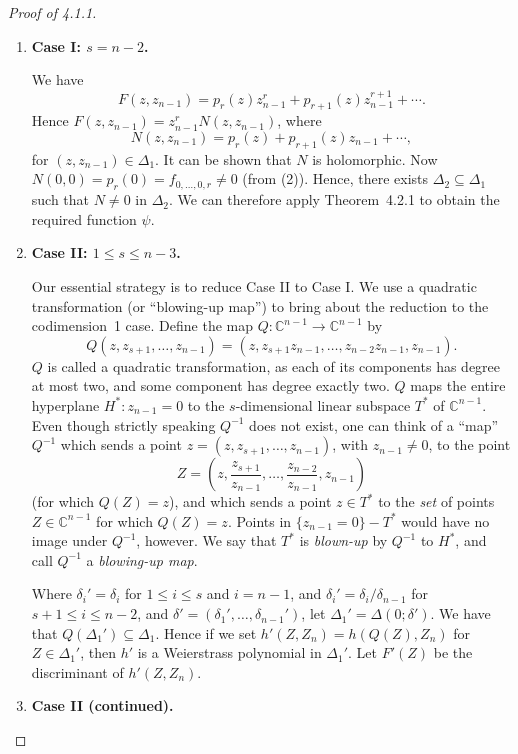 \documentclass[11pt]{article}
\theoremstyle{plain}
\theoremstyle{definition}
\newcommand{\C}{\mathbb{C}}
\begin{document}
\begin{proof}[Proof of 4.1.1]
\begin{enumerate}
\item \textbf{Case I: $s = n - 2$.}

We have
\[
F(z, z_{n-1}) = p_r(z) z_{n-1}^r + p_{r+1}(z) z_{n-1}^{r+1} + \cdots.
\]
Hence $F(z, z_{n-1}) = z_{n-1}^r N(z, z_{n-1})$, where
\[
N(z, z_{n-1}) = p_r(z) + p_{r+1}(z) z_{n-1} + \cdots,
\]
for $(z, z_{n-1}) \in \Delta_1$. It can be shown that $N$ is
holomorphic. Now $N(0, 0) = p_r(0) = f_{0, \ldots, 0, r} \ne 0$ (from
(2)). Hence, there exists $\Delta_2 \subseteq \Delta_1$ such that
$N \ne 0$ in $\Delta_2$. We can therefore apply Theorem~4.2.1 to
obtain the required function $\psi$.

\item \textbf{Case II: $1 \le s \le n - 3$.}

Our essential strategy is to reduce Case II to Case I. We use a
quadratic transformation (or ``blowing-up map'') to bring about the
reduction to the codimension~1 case. Define the map
$Q : \C^{n-1} \to \C^{n-1}$ by
\[
Q(z, z_{s+1}, \ldots, z_{n-1}) = (z, z_{s+1} z_{n-1}, \ldots,
z_{n-2} z_{n-1}, z_{n-1}).
\]
$Q$ is called a quadratic transformation, as each of its components
has degree at most two, and some component has degree exactly two.
$Q$ maps the entire hyperplane $H^* : z_{n-1} = 0$ to the
$s$-dimensional linear subspace $T^*$ of $\C^{n-1}$. Even though
strictly speaking $Q^{-1}$ does not exist, one can think of a ``map''
$Q^{-1}$ which sends a point
$z = (z, z_{s+1}, \ldots, z_{n-1})$, with $z_{n-1} \ne 0$, to the
point
\[
Z = \left( z, \frac{z_{s+1}}{z_{n-1}}, \ldots,
\frac{z_{n-2}}{z_{n-1}}, z_{n-1} \right)
\]
(for which $Q(Z) = z$), and which sends a point $z \in T^*$ to the
\emph{set} of points $Z \in \C^{n-1}$ for which $Q(Z) = z$. Points in
$\{ z_{n-1} = 0 \} - T^*$ would have no image under $Q^{-1}$, however.
We say that $T^*$ is \emph{blown-up} by $Q^{-1}$ to $H^*$, and call
$Q^{-1}$ a \emph{blowing-up map}.

Where $\delta_i' = \delta_i$ for $1 \le i \le s$ and $i = n-1$, and
$\delta_i' = \delta_i / \delta_{n-1}$ for $s+1 \le i \le n-2$, and
$\delta' = (\delta_1', \ldots, \delta_{n-1}')$, let
$\Delta_1' = \Delta(0; \delta')$. We have that
$Q(\Delta_1') \subseteq \Delta_1$. Hence if we set
$h'(Z, Z_n) = h(Q(Z), Z_n)$ for $Z \in \Delta_1'$, then $h'$ is a
Weierstrass polynomial in $\Delta_1'$. Let $F'(Z)$ be the discriminant
of $h'(Z, Z_n)$.

\item \textbf{Case II (continued).}


\end{enumerate}
\end{proof}
\end{document}
